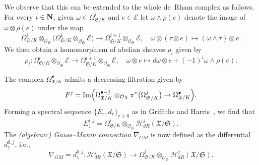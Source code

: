 \begin{rem}
We observe that this can be extended to the whole de~Rham complex as follows. 
For every $i \in \mathbf{N}$, given $\omega \in \Omega_{\mathfrak{S}/K}^i$ and 
$e \in \mathcal{E}$ let $\omega \wedge \rho(e)$ denote the image of 
$\omega \otimes \rho(e)$ under the map
\begin{equation*}
\Omega_{\mathfrak{S}/K}^i \otimes_{\mathcal{O}_{\mathfrak{S}}} 
    \bigl(\Omega_{\mathfrak{S}/K}^1 \otimes_{\mathcal{O}_{\mathfrak{S}}} \mathcal{E}\bigr) 
    \to \Omega_{\mathfrak{S}/K}^{i+1} \otimes_{\mathcal{O}_{\mathfrak{S}}} \mathcal{E}, \quad 
\omega \otimes (\tau \otimes e) \mapsto (\omega \wedge \tau) \otimes e.
\end{equation*}
We then obtain a homomorphism of abelian sheaves $\rho_i$ given by 
\begin{equation*}
\rho_i \colon \Omega_{\mathfrak{S}/K}^i \otimes_{\mathcal{O}_{\mathfrak{S}}} \mathcal{E} 
    \to \Omega_{\mathfrak{S}/K}^{i+1} \otimes_{\mathcal{O}_{\mathfrak{S}}} \mathcal{E}, \quad 
    \omega \otimes e \mapsto d \omega \otimes e + (-1)^i \omega \wedge \rho(e).
\end{equation*}
\end{rem}

\begin{defn}
The complex $\Omega_{\mathfrak{X}/K}^{\bullet}$ admits a decreasing filtration given by 
\begin{equation*}
F^j = 
    \operatorname{Im}\Bigl( \Omega_{\mathfrak{X}/K}^{\bullet - j} \otimes_{\mathcal{O}_{\mathfrak{X}}} 
    \pi^* \bigl(\Omega_{\mathfrak{S}/K}^j\bigr) \rightarrow \Omega_{\mathfrak{X}/K}^{\bullet} \Bigr).
\end{equation*}
Forming a spectral sequence $\{E_r, d_r\}_{r \geq 0}$ as in Griffiths and 
Harris~\citep[\S 3.5, p.\ 440]{GriffithsHarris1978}, we find that 
\begin{equation*}
E_1^{i,j} = 
    \Omega_{\mathfrak{S}/K}^i \otimes_{\mathcal{O}_{\mathfrak{S}}} 
    \mathcal{H}_{dR}^j(\mathfrak{X}/\mathfrak{S}).
\end{equation*}
The \emph{(algebraic) Gauss--Manin connection} $\nabla_{GM}$ is now defined as 
the differential $d_1^{0,j}$, i.e., 
\begin{equation*}
\nabla_{GM} = 
    d_1^{0,j} \colon \mathcal{H}_{dR}^j(\mathfrak{X}/\mathfrak{S}) \to 
    \Omega_{\mathfrak{S}/K}^1 \otimes_{\mathcal{O}_{\mathfrak{S}}} 
    \mathcal{H}_{dR}^j(\mathfrak{X}/\mathfrak{S}).
\end{equation*}
\end{defn}

